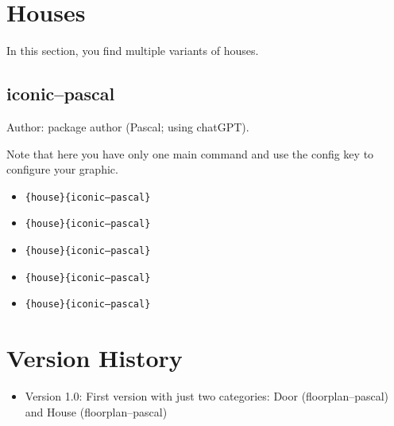 \documentclass{article}
\begin{document}
\section{Houses}

In this section, you find multiple variants of houses.

\subsection{iconic--pascal}

Author: package author (Pascal; using chatGPT). 

Note that here you have only one main command and use the config key to configure your graphic.

\begin{itemize}
  \item \texttt{\string\everydaySymbol\{house\}\{iconic--pascal\}} \dotfill\ 

  \item \texttt{\string\everydaySymbol[config=\{middleDoor,chimney\}]\{house\}\{iconic--pascal\}} \dotfill\ 

  \item \texttt{\string\everydaySymbol[config=\{rightDoor,leftWindow\}]\{house\}\{iconic--pascal\}} \dotfill\ 

  \item \texttt{\string\everydaySymbol[config=twoWindows,color=red]\{house\}\{iconic--pascal\}} \dotfill\ 

  \item \texttt{\string\everydaySymbol[config=\{twoWindows,middleDoor\}]\{house\}\{iconic--pascal\}} \dotfill\ 

\end{itemize}

\section*{Version History}

\begin{itemize}
  \item Version 1.0: First version with just two categories: Door (floorplan--pascal) and House (floorplan--pascal)
\end{itemize}
\end{document}
